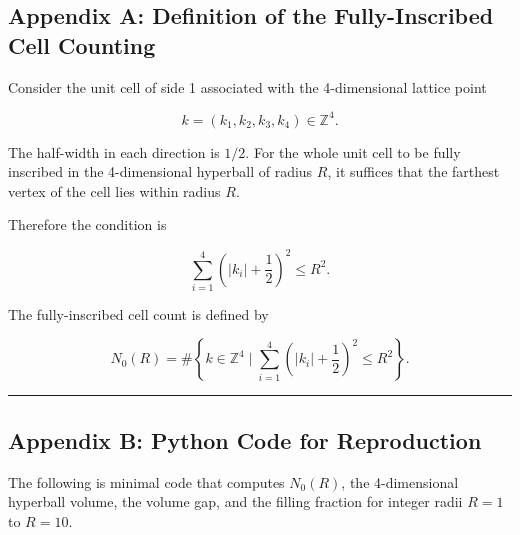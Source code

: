 \documentclass[
]{article}
\begin{document}
\subsection{Appendix A: Definition of the Fully-Inscribed Cell
Counting}\label{appendix-a-definition-of-the-fully-inscribed-cell-counting}

Consider the unit cell of side 1 associated with the 4-dimensional
lattice point

\[
k=(k_1,k_2,k_3,k_4)\in\mathbb{Z}^4.
\]

The half-width in each direction is \(1/2\). For the whole unit cell to
be fully inscribed in the 4-dimensional hyperball of radius \(R\), it
suffices that the farthest vertex of the cell lies within radius \(R\).

Therefore the condition is

\[
\sum_{i=1}^{4}\left(|k_i|+\frac12\right)^2\le R^2.
\]

The fully-inscribed cell count is defined by

\[
N_0(R)=\#\left\{k\in\mathbb{Z}^4\mid
\sum_{i=1}^{4}\left(|k_i|+\frac12\right)^2\le R^2
\right\}.
\]

\begin{center}\rule{0.5\linewidth}{0.5pt}\end{center}

\subsection{Appendix B: Python Code for
Reproduction}\label{appendix-b-python-code-for-reproduction}

The following is minimal code that computes \(N_0(R)\), the
4-dimensional hyperball volume, the volume gap, and the filling fraction
for integer radii \(R=1\) to \(R=10\).
\end{document}
